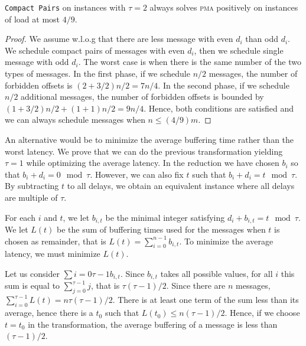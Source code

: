 \documentclass[a4paper,UKenglish,cleveref, autoref, thm-restate]{lipics-v2019}
\newcommand\pma{\textsc{pma}\xspace}
\newcommand\compactpair{\texttt{Compact Pairs}\xspace}
\begin{document}
\begin{theorem}
\compactpair on instances with $\tau =2$ always solves \pma positively on instances of load at most $4/9$.
\end{theorem}
\begin{proof}
We assume w.l.o.g that there are less message with even $d_i$ than odd $d_i$.
We schedule compact pairs of messages with even $d_i$, then we schedule single message with odd $d_i$. The worst case is when there is the same number of the two types of messages. In the first phase, if we schedule $n/2$ messages, the number of forbidden offsets is $(2 + 3/2)n/2 = 7n/4$. In the second phase, if we schedule $n/2$ additional messages, the number of forbidden offsets is bounded by $ (1 + 3/2) n/2  + (1 + 1)n/2 = 9n/4$. Hence, both conditions are satisfied and we can always schedule messages when $n \leq (4/9)m$.
\end{proof}



An alternative would be to minimize the average buffering time rather than the worst latency. We prove that we can do the previous transformation yielding $\tau=1$ while optimizing the average latency.
In the reduction we have chosen $b_i$ so that $b_i + d_i = 0 \mod \tau$.
However, we can also fix $t$ such that $b_i + d_i = t \mod \tau$.
By subtracting $t$ to all delays, we obtain an equivalent instance where 
all delays are multiple of $\tau$.

 For each $i$ and $t$, we let $b_{i,t}$ be the minimal integer satisfying $d_i + b_{i,t} = t \mod \tau$. We let $L(t)$ be the sum of buffering times used for the messages when $t$ is chosen as remainder, that is $L(t) = \sum_{i=0}^{n-1} b_{i,t}$. To minimize the average latency, we must minimize $L(t)$.

 Let us consider $\sum{i=0}{\tau-1} b_{i,t}$. Since $b_{i,t}$ takes all possible values, for all $i$ this sum is equal to $\sum_{j=0}^{\tau-1} j$, that is $\tau (\tau-1)/2$. Since there are $n$ messages, $\sum_{i=0}^{\tau -1} L(t) = n \tau (\tau-1)/2$. There is at least one term of the sum less than its average, hence there is a $t_0$ such that $L(t_0) \leq n (\tau-1)/2$. Hence, if we choose $t= t_0$ in the transformation, the average buffering of a message is less than $(\tau -1)/2$.
\end{document}
